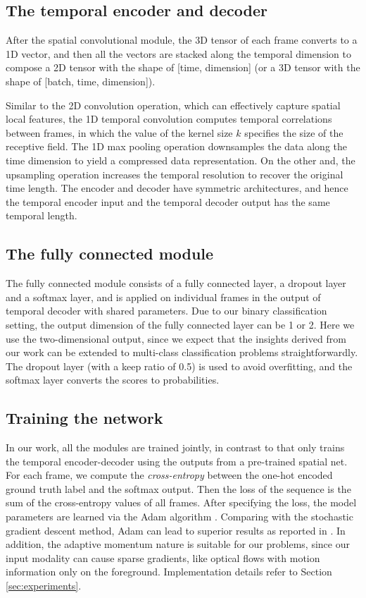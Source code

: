 \documentclass[runningheads]{llncs}
\begin{document}
\subsection{The temporal encoder and decoder}
After the spatial convolutional module, the 3D tensor of each frame converts to a 1D vector, and then all the vectors are stacked along the temporal dimension to compose a 2D tensor with the shape of [time, dimension] (or a 3D tensor with the shape of [batch, time, dimension]).

Similar to the 2D convolution operation, which can effectively capture spatial local features, the 1D temporal convolution computes temporal correlations between frames, in which the value of the kernel size $k$ specifies the size of the receptive field. The 1D max pooling operation downsamples the data along the time dimension to yield a compressed data representation. On the other and, the upsampling operation increases the temporal resolution to recover the original time length. The encoder and decoder have symmetric architectures, and hence the temporal encoder input and the temporal decoder output has the same temporal length. 





\subsection{The fully connected module}
The fully connected module consists of a fully connected layer, a dropout layer and a softmax layer, and is applied on individual frames in the output of temporal decoder with shared parameters. Due to our binary classification setting, the output dimension of the fully connected layer can be 1 or 2. Here we use the two-dimensional output, since we expect that the insights derived from our work can be extended to multi-class classification problems straightforwardly. The dropout layer (with a keep ratio of 0.5) is used to avoid overfitting, and the softmax layer converts the scores to probabilities. 



\subsection{Training the network}
In our work, all the modules are trained jointly, in contrast to \cite{Lea_2017_CVPR} that only trains the temporal encoder-decoder using the outputs from a pre-trained spatial net. For each frame, we compute the {\em cross-entropy} between the one-hot encoded ground truth label and the softmax output. Then the loss of the sequence is the sum of the cross-entropy values of all frames. After specifying the loss, the model parameters are learned via the Adam algorithm \cite{kingma2014adam}. Comparing with the stochastic gradient descent method, Adam can lead to superior results as reported in \cite{kingma2014adam}. In addition, the adaptive momentum nature is suitable for our problems, since our input modality can cause sparse gradients, like optical flows with motion information only on the foreground. Implementation details refer to Section \ref{sec:experiments}.
\end{document}
